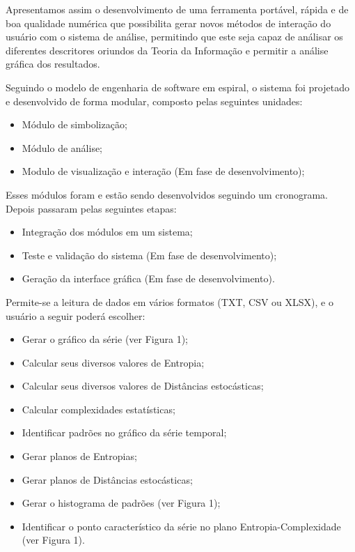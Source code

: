 \documentclass[12pt,letterpaper]{article}
\begin{document}
Apresentamos assim o desenvolvimento de uma ferramenta portável, rápida e de boa qualidade numérica que possibilita gerar novos métodos de interação do usuário com o sistema de análise, permitindo que este seja capaz de análisar os diferentes descritores oriundos da Teoria da Informação e permitir a análise gráfica dos resultados.

Seguindo o modelo de engenharia de software em espiral, o sistema foi projetado e desenvolvido de forma modular, composto pelas seguintes unidades:

\begin{itemize}
\item Módulo de simbolização;
\item Módulo de análise;
\item Modulo de visualização e interação (Em fase de desenvolvimento);
\end{itemize} 

Esses módulos foram e estão sendo desenvolvidos seguindo um cronograma. Depois passaram pelas seguintes etapas:

\begin{itemize}
\item Integração dos módulos em um sistema;
\item Teste e validação do sistema (Em fase de desenvolvimento);
\item Geração da interface gráfica (Em fase de desenvolvimento).
\end{itemize}

Permite-se a leitura de dados em vários formatos (TXT, CSV ou XLSX), e o usuário a seguir poderá escolher:

\begin{itemize}

	\item Gerar o gráfico da série (ver Figura 1);
	\item Calcular seus diversos valores de Entropia;
	\item Calcular seus diversos valores de Distâncias estocásticas;
	\item Calcular complexidades estatísticas;
    \item Identificar padrões no gráfico da série temporal;
    \item Gerar planos de Entropias;
    \item Gerar planos de Distâncias estocásticas;
	\item Gerar o histograma de padrões (ver Figura 1);
	\item Identificar o ponto característico da série no plano Entropia-Complexidade (ver Figura 1).

\end{itemize}
\end{document}
